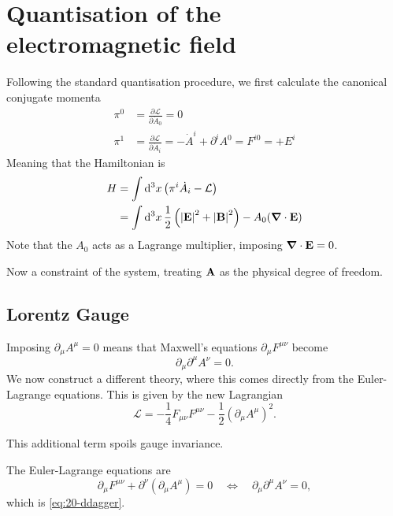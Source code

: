 
\section{Quantisation of the electromagnetic field}%
\label{sec:quantisation_of_the_electromagnetic_field}

Following the standard quantisation procedure, we first calculate the canonical conjugate momenta
\begin{align}
  \pi^0 &= \frac{\partial \mathcal{L}}{\partial \dot{A}_0} = 0 \\
  \pi^1 &= \frac{\partial \mathcal{L}}{\partial \dot{A}_{i}} = - \dot{A}^{i} + \partial^{i} A^0 = F^{i0} = +E^{i}
\end{align}
Meaning that the Hamiltonian is
\begin{align}
  H &= \int \dd[3]{x} \left( \pi^i \dot{A}_{i} - \mathcal{L} \right) \\
    &= \int \dd[3]{x} \frac{1}{2} \left( \abs{\vb{E}}^2 + \abs{\vb{B}}^2 \right) - A_0 (\grad \cdot \vb{E})
\end{align}
Note that the $A_0$ acts as a Lagrange multiplier, imposing $\grad \cdot \vb{E} = 0$.

Now a constraint of the system, treating $\vb{A}$ as the physical degree of freedom.

\subsection*{Lorentz Gauge}%

Imposing $\partial_{\mu} A^{\mu} = 0$ means that Maxwell's equations $\partial_{\mu} F^{\mu\nu}$ become 
\begin{equation}
  \label{eq:20-ddagger}
  \partial_{\mu} \partial^{\mu} A^{\nu} = 0.
\end{equation}
We now construct a different theory, where this comes directly from the Euler-Lagrange equations. This is given by the new Lagrangian
\begin{equation}
  \mathcal{L} = - \frac{1}{4} F_{\mu\nu} F^{\mu\nu} - \frac{1}{2} (\partial_{\mu} A^{\mu})^2.
\end{equation}
\begin{remark}
  This additional term spoils gauge invariance.
\end{remark}
The Euler-Lagrange equations are
\begin{equation}
  \partial_{\mu} F^{\mu\nu} + \partial^{\nu}(\partial_{\mu} A^{\mu}) = 0 \quad \iff \quad \partial_{\mu} \partial^{\mu} A^{\nu} = 0,
\end{equation}
which is \eqref{eq:20-ddagger}.

